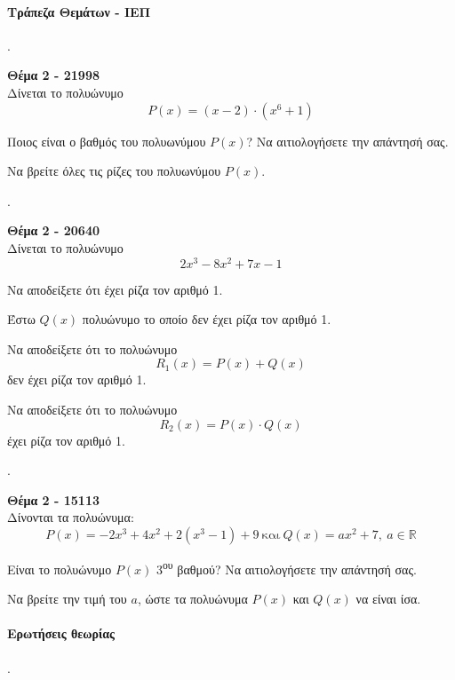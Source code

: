 \documentclass[11pt,a4paper,twocolumn]{article}
\newcounter{askhsh}
\newcommand{\askhsh}{\large\theaskhsh.\ \addtocounter{askhsh}{1}}
\newcommand{\tss}[1]{\textsuperscript{#1}}
\begin{document}
\paragraph{Τράπεζα Θεμάτων - ΙΕΠ}
\askhsh \textbf{Θέμα 2 - 21998}\\
Δίνεται το πολυώνυμο 
\[ P(x) = (x-2)\cdot (x^6+1) \]
\begin{alist}
\item Ποιος είναι ο βαθμός του πολυωνύμου $P(x)$? Να αιτιολογήσετε την απάντησή σας.
\item Να βρείτε όλες τις ρίζες του πολυωνύμου $P(x)$.
\end{alist}
\askhsh \textbf{Θέμα 2 - 20640}\\
Δίνεται το πολυώνυμο
\[ 2x^3-8x^2+7x-1 \]
\begin{alist}
\item Να αποδείξετε ότι έχει ρίζα τον αριθμό 1.
\item Έστω $Q(x)$ πολυώνυμο το οποίο δεν έχει ρίζα τον αριθμό 1.
\begin{rlist}
\item Να αποδείξετε ότι το πολυώνυμο
\[R_1(x)=P(x)+Q(x)\] 
δεν έχει ρίζα τον αριθμό 1.
\item Να αποδείξετε ότι το πολυώνυμο
\[ R_2(x)=P(x)\cdot Q(x) \]
έχει ρίζα τον αριθμό 1.
\end{rlist}
\end{alist}
\askhsh \textbf{Θέμα 2 - 15113}\\
Δίνονται τα πολυώνυμα:
\[ P(x)=-2x^3+4x^2+2(x^3-1)+9\ \text{και}\ Q(x)=ax^2+7,\ a\in\mathbb{R} \]
\begin{alist}
\item Είναι το πολυώνυμο $P(x)$ 3\tss{ου} βαθμού? Να αιτιολογήσετε την απάντησή σας.
\item Να βρείτε την τιμή του $a$, ώστε τα πολυώνυμα $P(x)$ και $Q(x)$ να είναι ίσα. 
\end{alist}
\paragraph{Ερωτήσεις θεωρίας}
\askhsh
\end{document}
